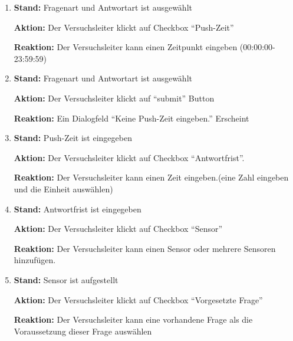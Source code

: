 \documentclass[a4paper]{scrreprt}
\begin{document}
\begin{itemize}
\begin{enumerate}
                        \item \par \textbf{Stand: } Fragenart und Antwortart ist ausgewählt
                              \par \textbf{Aktion: } Der Versuchsleiter klickt auf Checkbox ``Push-Zeit''
                              \par \textbf{Reaktion: } Der Versuchsleiter kann einen Zeitpunkt eingeben (00:00:00-23:59:59)

                        \item \par \textbf{Stand: } Fragenart und Antwortart ist ausgewählt
                              \par \textbf{Aktion: } Der Versuchsleiter klickt auf ``submit'' Button
                              \par \textbf{Reaktion: } Ein Dialogfeld ``Keine Push-Zeit eingeben.'' Erscheint

                        \item \par \textbf{Stand: } Push-Zeit ist eingegeben
                              \par \textbf{Aktion: } Der Versuchsleiter klickt auf Checkbox ``Antwortfrist''.
                              \par \textbf{Reaktion: } Der Versuchsleiter kann einen Zeit eingeben.(eine Zahl eingeben und die Einheit auswählen)


                        \item \par \textbf{Stand: } Antwortfrist ist eingegeben
                              \par \textbf{Aktion: } Der Versuchsleiter klickt auf Checkbox ``Sensor''
                              \par \textbf{Reaktion: } Der Versuchsleiter kann einen Sensor oder mehrere Sensoren hinzufügen.

                        \item \par \textbf{Stand: } Sensor ist aufgestellt
                              \par \textbf{Aktion: } Der Versuchsleiter klickt auf Checkbox ``Vorgesetzte Frage''
                              \par \textbf{Reaktion: } Der Versuchsleiter kann eine vorhandene Frage als die Voraussetzung dieser Frage auswählen


\end{enumerate}
\end{itemize}
\end{document}
